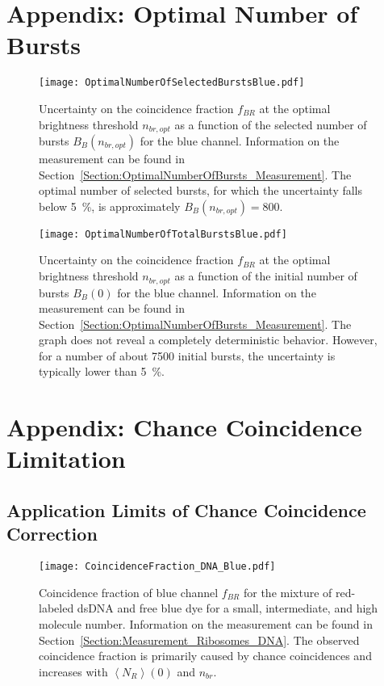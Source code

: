 \chapter{Appendix: Optimal Number of Bursts}

\vfill
\begin{figure}[h]
	\centering
	\texttt{[image: OptimalNumberOfSelectedBurstsBlue.pdf]}
	\caption[Optimal number of selected bursts for blue channel]{Uncertainty on the coincidence fraction $f_{BR}$ at the optimal brightness threshold $n_{br,opt}$ as a function of the selected number of bursts $B_B(n_{br,opt})$ for the blue channel. Information on the measurement can be found in Section~\ref{Section:OptimalNumberOfBursts_Measurement}. The optimal number of selected bursts, for which the uncertainty falls below \SI{5}{\percent}, is approximately $B_B(n_{br,opt}) = 800$.}
	\label{fig:SelectedNumberOfBurstsBlue}
\end{figure} 
\vfill

\vfill
\begin{figure}[h]
	\centering
	\texttt{[image: OptimalNumberOfTotalBurstsBlue.pdf]}
	\caption[Optimal number of initial bursts for blue channel]{Uncertainty on the coincidence fraction $f_{BR}$ at the optimal brightness threshold $n_{br,opt}$ as a function of the initial number of bursts $B_B(0)$ for the blue channel. Information on the measurement can be found in Section~\ref{Section:OptimalNumberOfBursts_Measurement}. The graph does not reveal a completely deterministic behavior. However, for a number of about \num{7500} initial bursts, the uncertainty is typically lower than \SI{5}{\percent}.}
	\label{fig:TotalNumberOfBurstsBlue}
\end{figure} 
\vfill

\chapter{Appendix: Chance Coincidence Limitation}

\section{Application Limits of Chance Coincidence Correction}

\vfill
\begin{figure}[h]
	\centering
	\texttt{[image: CoincidenceFraction\_DNA\_Blue.pdf]}
	\caption[Coincidence fraction of blue channel for mixture of red-labeled \gls{dsDNA} and free blue dye]{Coincidence fraction of blue channel $f_{BR}$ for the mixture of red-labeled \gls{dsDNA} and free blue dye for a small, intermediate, and high molecule number. Information on the measurement can be found in Section~\ref{Section:Measurement_Ribosomes_DNA}. The observed coincidence fraction is primarily caused by chance coincidences and increases with $\left\langle N_R \right\rangle (0)$ and $n_{br}$.}
	\label{fig:CoincidenceFraction_DNA_Blue}
\end{figure}
\vfill

